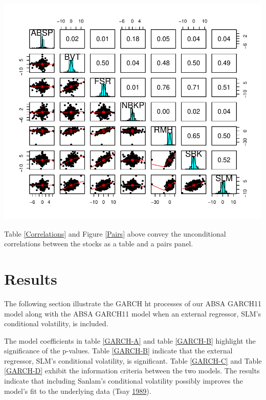 \documentclass[11pt,preprint, authoryear]{elsarticle}
\let\origfigure\figure
\let\endorigfigure\endfigure
\renewenvironment{figure}[1][2] {
    \expandafter\origfigure\expandafter[H]
} {
    \endorigfigure
}
\numberwithin{equation}{section}
\numberwithin{figure}{section}
\numberwithin{table}{section}
\begin{document}
\begin{figure}[H]
{\centering \includegraphics{Template_files/figure-latex/figure3-1} 

}

\caption{Pairs Panel \label{Pairs}}\label{fig:figure3}
\end{figure}

Table \ref{Correlations} and Figure \ref{Pairs} above convey the
unconditional correlations between the stocks as a table and a pairs
panel.

\section{\texorpdfstring{Results
\label{Results}}{Results }}\label{results}

The following section illustrate the GARCH ht processes of our ABSA
GARCH11 model along with the ABSA GARCH11 model when an external
regressor, SLM's conditional volatility, is included.

The model coefficients in table \ref{GARCH-A} and table \ref{GARCH-B}
highlight the significance of the p-values. Table \ref{GARCH-B} indicate
that the external regressor, SLM's conditional volatility, is
significant. Table \ref{GARCH-C} and Table \ref{GARCH-D} exhibit the
information criteria between the two models. The results indicate that
including Sanlam's conditional volatility possibly improves the model's
fit to the underlying data (Tsay
\protect\hyperlink{ref-Tsay1989}{1989}).
\end{document}
